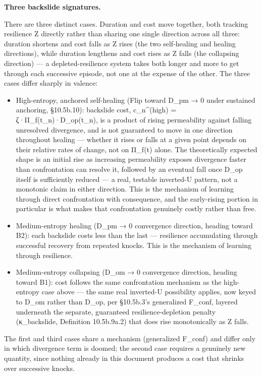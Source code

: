 \documentclass[
]{article}
\begin{document}
\textbf{Three backslide signatures.}

There are three distinct cases. Duration and cost move together, both
tracking resilience Z directly rather than sharing one single direction
across all three: duration shortens and cost falls as Z rises (the two
self-healing and healing directions), while duration lengthens and cost
rises as Z falls (the collapsing direction) --- a depleted-resilience
system takes both longer and more to get through each successive
episode, not one at the expense of the other. The three cases differ
sharply in valence:

\begin{itemize}
\item
  High-entropy, anchored self-healing (Flip toward D\_pm → 0 under
  sustained anchoring, §10.5b.10): backslide cost, c\_n\^{}(high) =
  ζ·Π\_f(t\_n)·D\_op(t\_n), is a product of rising permeability against
  falling unresolved divergence, and is not guaranteed to move in one
  direction throughout healing --- whether it rises or falls at a given
  point depends on their relative rates of change, not on Π\_f(t) alone.
  The theoretically expected shape is an initial rise as increasing
  permeability exposes divergence faster than confrontation can resolve
  it, followed by an eventual fall once D\_op itself is sufficiently
  reduced --- a real, testable inverted-U pattern, not a monotonic claim
  in either direction. This is the mechanism of learning through direct
  confrontation with consequence, and the early-rising portion in
  particular is what makes that confrontation genuinely costly rather
  than free.
\item
  Medium-entropy healing (D\_pm → 0 convergence direction, heading
  toward B2): each backslide costs less than the last --- resilience
  accumulating through successful recovery from repeated knocks. This is
  the mechanism of learning through resilience.
\item
  Medium-entropy collapsing (D\_om → 0 convergence direction, heading
  toward B1): cost follows the same confrontation mechanism as the
  high-entropy case above --- the same real inverted-U possibility
  applies, now keyed to D\_om rather than D\_op, per §10.5b.3's
  generalized F\_conf, layered underneath the separate, guaranteed
  resilience-depletion penalty (κ\_backslide, Definition 10.5b.9a.2)
  that does rise monotonically as Z falls.
\end{itemize}

The first and third cases share a mechanism (generalized F\_conf) and
differ only in which divergence term is doomed; the second case requires
a genuinely new quantity, since nothing already in this document
produces a cost that shrinks over successive knocks.
\end{document}
